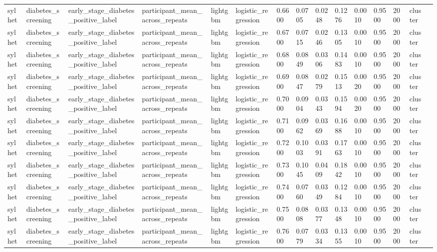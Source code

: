 \begin{tabular}{lllllllllllllll}
sylhet & diabetes\_screening & early\_stage\_diabetes\_positive\_label & participant\_mean\_across\_repeats & lightgbm & logistic\_regression & 0.6600 & 0.0705 & 0.0248 & 0.1276 & 0.0010 & 0.9500 & 2000 & cluster &  \\
sylhet & diabetes\_screening & early\_stage\_diabetes\_positive\_label & participant\_mean\_across\_repeats & lightgbm & logistic\_regression & 0.6700 & 0.0715 & 0.0246 & 0.1305 & 0.0010 & 0.9500 & 2000 & cluster &  \\
sylhet & diabetes\_screening & early\_stage\_diabetes\_positive\_label & participant\_mean\_across\_repeats & lightgbm & logistic\_regression & 0.6800 & 0.0849 & 0.0306 & 0.1483 & 0.0010 & 0.9500 & 2000 & cluster &  \\
sylhet & diabetes\_screening & early\_stage\_diabetes\_positive\_label & participant\_mean\_across\_repeats & lightgbm & logistic\_regression & 0.6900 & 0.0847 & 0.0279 & 0.1513 & 0.0020 & 0.9500 & 2000 & cluster &  \\
sylhet & diabetes\_screening & early\_stage\_diabetes\_positive\_label & participant\_mean\_across\_repeats & lightgbm & logistic\_regression & 0.7000 & 0.0904 & 0.0343 & 0.1594 & 0.0020 & 0.9500 & 2000 & cluster &  \\
sylhet & diabetes\_screening & early\_stage\_diabetes\_positive\_label & participant\_mean\_across\_repeats & lightgbm & logistic\_regression & 0.7100 & 0.0962 & 0.0369 & 0.1688 & 0.0010 & 0.9500 & 2000 & cluster &  \\
sylhet & diabetes\_screening & early\_stage\_diabetes\_positive\_label & participant\_mean\_across\_repeats & lightgbm & logistic\_regression & 0.7200 & 0.1003 & 0.0391 & 0.1763 & 0.0010 & 0.9500 & 2000 & cluster &  \\
sylhet & diabetes\_screening & early\_stage\_diabetes\_positive\_label & participant\_mean\_across\_repeats & lightgbm & logistic\_regression & 0.7300 & 0.1045 & 0.0409 & 0.1842 & 0.0010 & 0.9500 & 2000 & cluster &  \\
sylhet & diabetes\_screening & early\_stage\_diabetes\_positive\_label & participant\_mean\_across\_repeats & lightgbm & logistic\_regression & 0.7400 & 0.0760 & 0.0349 & 0.1284 & 0.0010 & 0.9500 & 2000 & cluster &  \\
sylhet & diabetes\_screening & early\_stage\_diabetes\_positive\_label & participant\_mean\_across\_repeats & lightgbm & logistic\_regression & 0.7500 & 0.0808 & 0.0377 & 0.1348 & 0.0010 & 0.9500 & 2000 & cluster &  \\
sylhet & diabetes\_screening & early\_stage\_diabetes\_positive\_label & participant\_mean\_across\_repeats & lightgbm & logistic\_regression & 0.7600 & 0.0779 & 0.0334 & 0.1355 & 0.0010 & 0.9500 & 2000 & cluster &  \\

\end{tabular}
